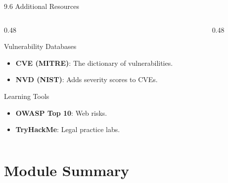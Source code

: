 \documentclass[aspectratio=169]{beamer}  %
\begin{document}
\begin{frame}{9.6 Additional Resources}
    \begin{columns}[T]
        \begin{column}{0.48\textwidth}
            \begin{block}{Vulnerability Databases}
                \footnotesize
                \begin{itemize}
                    \item \textbf{CVE (MITRE)}: The dictionary of vulnerabilities.
                    \item \textbf{NVD (NIST)}: Adds severity scores to CVEs.
                \end{itemize}
            \end{block}
            \begin{block}{Learning Tools}
                \footnotesize
                \begin{itemize}
                    \item \textbf{OWASP Top 10}: Web risks.
                    \item \textbf{TryHackMe}: Legal practice labs.
                \end{itemize}
            \end{block}
        \end{column}
        \begin{column}{0.48\textwidth}
            \begin{center}
            \end{center}
        \end{column}
    \end{columns}
\end{frame}

\section*{Module Summary}
\end{document}

